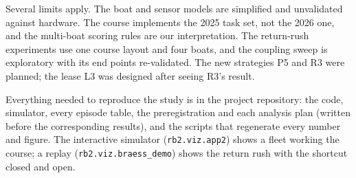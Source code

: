 \documentclass[11pt]{article}
\theoremstyle{definition}
\begin{document}
Several limits apply. The boat and sensor models are simplified and unvalidated against hardware. The course implements the 2025 task set, not the 2026 one, and the multi-boat scoring rules are our interpretation. The return-rush experiments use one course layout and four boats, and the coupling sweep is exploratory with its end points re-validated. The new strategies P5 and R3 were planned; the lease L3 was designed after seeing R3's result.

Everything needed to reproduce the study is in the project repository: the code, simulator, every episode table, the preregistration and each analysis plan (written before the corresponding results), and the scripts that regenerate every number and figure. The interactive simulator (\texttt{rb2.viz.app2}) shows a fleet working the course; a replay (\texttt{rb2.viz.braess\_demo}) shows the return rush with the shortcut closed and open.



{\footnotesize\setlength{\bibsep}{1pt}
}
\end{document}

